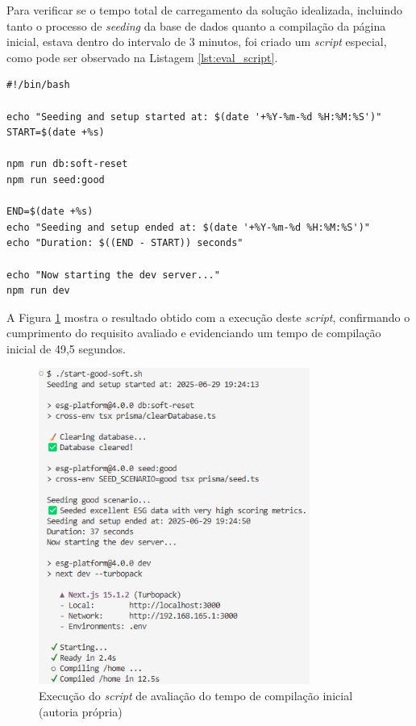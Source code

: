 Para verificar se o tempo total de carregamento da solução idealizada, incluindo tanto o processo de \textit{seeding} da base de dados quanto a compilação da página inicial, estava dentro do intervalo de 3 minutos, foi criado um \textit{script} especial, como pode ser observado na Listagem \ref{lst:eval_script}.

\newpage

\begin{lstlisting}[style=customts, caption={\textit{Script} de avaliação de performance da iniciação da aplicação desenvolvida}, label={lst:eval_script}]
#!/bin/bash

echo "Seeding and setup started at: $(date '+%Y-%m-%d %H:%M:%S')"
START=$(date +%s)

npm run db:soft-reset
npm run seed:good

END=$(date +%s)
echo "Seeding and setup ended at: $(date '+%Y-%m-%d %H:%M:%S')"
echo "Duration: $((END - START)) seconds"

echo "Now starting the dev server..."
npm run dev
\end{lstlisting}

A Figura \ref{fig:initial_compile} mostra o resultado obtido com a execução deste \textit{script}, confirmando o cumprimento do requisito avaliado e evidenciando um tempo de compilação inicial de 49,5 segundos.

\begin{figure}[H]
    \centering
    \includegraphics[width=3.5in,keepaspectratio]{frontmatter/assets/compiling/initial_compile.png}
    \caption{Execução do \textit{script} de avaliação do tempo de compilação inicial (autoria própria)}
    \label{fig:initial_compile}
\end{figure}

